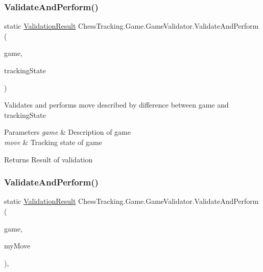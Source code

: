 \subsubsection{\texorpdfstring{ValidateAndPerform()}{ValidateAndPerform()}\hspace{0.1cm}{\footnotesize\ttfamily [2/3]}}
{\footnotesize\ttfamily static \mbox{\hyperlink{class_chess_tracking_1_1_game_1_1_validation_result}{Validation\+Result}} Chess\+Tracking.\+Game.\+Game\+Validator.\+Validate\+And\+Perform (\begin{DoxyParamCaption}\item[{\mbox{\hyperlink{class_chess_tracking_1_1_game_1_1_game_data}{Game\+Data}}}]{game,  }\item[{\mbox{\hyperlink{class_chess_tracking_1_1_multithreading_messages_1_1_tracking_state}{Tracking\+State}}}]{tracking\+State }\end{DoxyParamCaption})\hspace{0.3cm}{\ttfamily [static]}}



Validates and performs move described by difference between game and tracking\+State 


\begin{DoxyParams}{Parameters}
{\em game} & Description of game\\
\hline
{\em move} & Tracking state of game\\
\hline
\end{DoxyParams}
\begin{DoxyReturn}{Returns}
Result of validation
\end{DoxyReturn}
\mbox{\label{class_chess_tracking_1_1_game_1_1_game_validator_a616609a52db6c7aff18286405c71e49e}} 
\subsubsection{\texorpdfstring{ValidateAndPerform()}{ValidateAndPerform()}\hspace{0.1cm}{\footnotesize\ttfamily [3/3]}}
{\footnotesize\ttfamily static \mbox{\hyperlink{class_chess_tracking_1_1_game_1_1_validation_result}{Validation\+Result}} Chess\+Tracking.\+Game.\+Game\+Validator.\+Validate\+And\+Perform (\begin{DoxyParamCaption}\item[{\mbox{\hyperlink{class_chess_tracking_1_1_game_1_1_game_data}{Game\+Data}}}]{game,  }\item[{\mbox{\hyperlink{class_chess_tracking_1_1_game_1_1_game_move}{Game\+Move}}}]{my\+Move }\end{DoxyParamCaption})\hspace{0.3cm}{\ttfamily [static]}, {\ttfamily [private]}}



